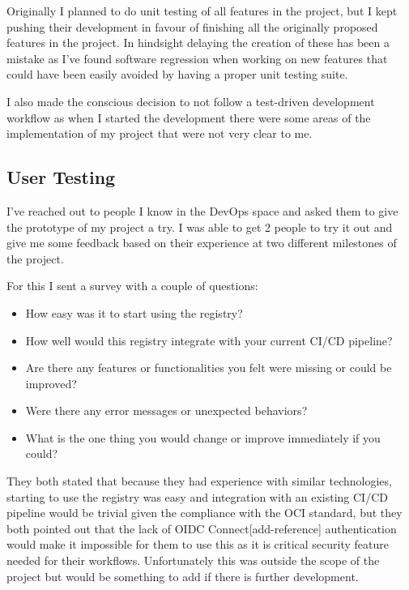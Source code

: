 \documentclass{article}
\begin{document}
  Originally I planned to do unit testing of all features in the project, but I kept pushing their development in favour of finishing all the originally proposed features in the project. In hindsight delaying the creation of these has been a mistake as I've found software regression when working on new features that could have been easily avoided by having a proper unit testing suite.
  
  I also made the conscious decision to not follow a test-driven development workflow as when I started the development there were some areas of the implementation of my project that were not very clear to me.

  \subsection{User Testing}

  I've reached out to people I know in the DevOps space and asked them to give the prototype of my project a try. I was able to get 2 people to try it out and give me some feedback based on their experience at two different milestones of the project.

  For this I sent a survey with a couple of questions:

  \begin{itemize}
    \item How easy was it to start using the registry?
    \item How well would this registry integrate with your current CI/CD pipeline?
    \item Are there any features or functionalities you felt were missing or could be improved?
    \item Were there any error messages or unexpected behaviors?
    \item What is the one thing you would change or improve immediately if you could?
  \end{itemize}

  They both stated that because they had experience with similar technologies, starting to use the registry was easy and integration with an existing CI/CD pipeline would be trivial given the compliance with the OCI standard, but they both pointed out that the lack of OIDC Connect[add-reference] authentication would make it impossible for them to use this as it is critical security feature needed for their workflows. Unfortunately this was outside the scope of the project but would be something to add if there is further development.
\end{document}
